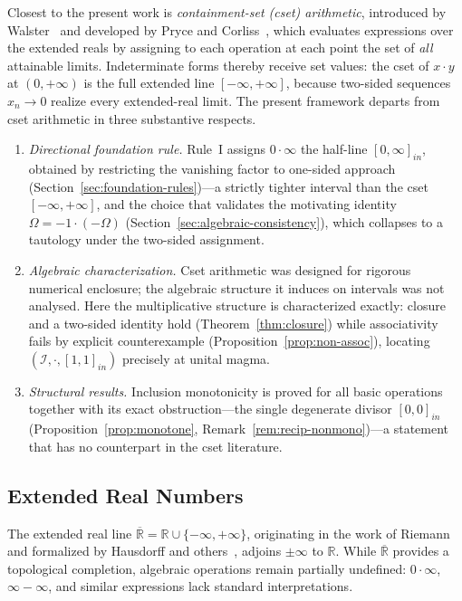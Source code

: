 \documentclass[11pt,a4paper]{article}
\theoremstyle{paperdef}
\newcommand{\Rext}{\overline{\mathbb{R}}}
\newcommand{\Iset}{\mathcal{I}}
\newcommand{\inI}[1]{[#1]_{in}}
\begin{document}
Closest to the present work is \emph{containment-set (cset)
arithmetic}, introduced by Walster~\cite{Walster1998} and developed
by Pryce and Corliss~\cite{PryceCorliss2006}, which evaluates
expressions over the extended reals by assigning to each operation at
each point the set of \emph{all} attainable limits. Indeterminate
forms thereby receive set values: the cset of $x \cdot y$ at
$(0, +\infty)$ is the full extended line $[-\infty, +\infty]$,
because two-sided sequences $x_n \to 0$ realize every extended-real
limit. The present framework departs from cset arithmetic in three
substantive respects.
\begin{enumerate}[label=(\roman*),leftmargin=2.5em]
  \item \emph{Directional foundation rule.} Rule~I assigns
    $0 \cdot \infty$ the half-line $\inI{0, \infty}$, obtained by
    restricting the vanishing factor to one-sided approach
    (Section~\ref{sec:foundation-rules})---a strictly tighter
    interval than the cset $[-\infty, +\infty]$, and the choice that
    validates the motivating identity
    $\Omega = -1 \cdot (-\Omega)$
    (Section~\ref{sec:algebraic-consistency}), which collapses to a
    tautology under the two-sided assignment.
  \item \emph{Algebraic characterization.} Cset arithmetic was
    designed for rigorous numerical enclosure; the algebraic
    structure it induces on intervals was not analysed. Here the
    multiplicative structure is characterized exactly: closure and a
    two-sided identity hold (Theorem~\ref{thm:closure}) while
    associativity fails by explicit counterexample
    (Proposition~\ref{prop:non-assoc}), locating
    $(\Iset, \cdot, \inI{1,1})$ precisely at unital magma.
  \item \emph{Structural results.} Inclusion monotonicity is proved
    for all basic operations together with its exact obstruction---the
    single degenerate divisor $\inI{0,0}$
    (Proposition~\ref{prop:monotone},
    Remark~\ref{rem:recip-nonmono})---a statement that has no
    counterpart in the cset literature.
\end{enumerate}

\subsection{Extended Real Numbers}

The extended real line $\Rext = \mathbb{R} \cup \{-\infty, +\infty\}$,
originating in the work of Riemann and formalized by Hausdorff and
others~\cite{Folland1999,RockafellarWets1998}, adjoins $\pm\infty$ to
$\mathbb{R}$. While $\Rext$ provides a topological completion,
algebraic operations remain partially undefined: $0 \cdot \infty$,
$\infty - \infty$, and similar expressions lack standard
interpretations.
\end{document}
